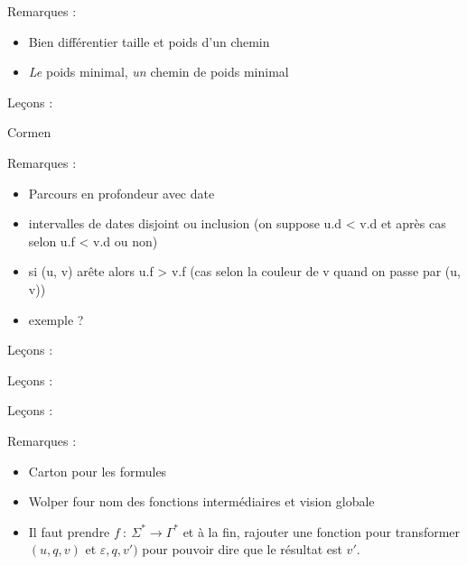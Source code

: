 \documentclass[../agregation.tex]{subfiles}
\begin{document}
Remarques :
\begin{itemize}
	\item Bien différentier taille et poids d'un chemin
	\item \emph{Le} poids minimal, \emph{un} chemin de poids minimal
\end{itemize}

Leçons :
\begin{itemize}
\end{itemize}
Cormen

Remarques :
\begin{itemize}
	\item Parcours en profondeur avec date
	\item intervalles de dates disjoint ou inclusion (on suppose u.d < v.d et après cas selon u.f < v.d ou non)
	\item si (u, v) arête alors u.f > v.f (cas selon la couleur de v quand on passe par (u, v))
	\item exemple ?
\end{itemize}


Leçons :
\begin{itemize}
\end{itemize}

Leçons :
\begin{itemize}
\end{itemize}


Leçons :
\begin{itemize}
\end{itemize}

Remarques :
\begin{itemize}
	\item Carton pour les formules
	\item Wolper four nom des fonctions intermédiaires et vision globale
	\item Il faut prendre $f~:~\Sigma^* \to \Gamma^*$ et à la fin, rajouter une fonction pour transformer $(u, q, v)$ et $\varepsilon, q, v')$ pour pouvoir dire que le résultat est $v'$.
\end{itemize}
\end{document}
